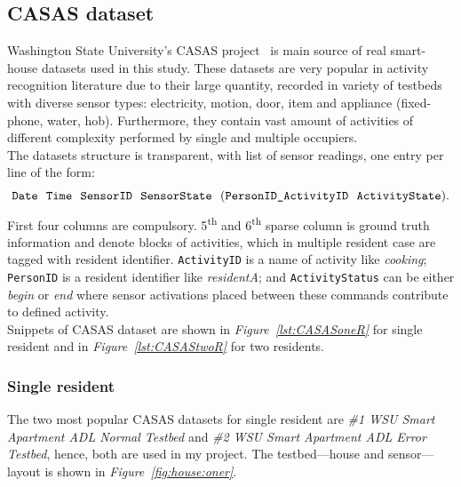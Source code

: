 \documentclass[10pt, a4paper, pdflatex, leqno, twoside, openright]{report}
\newcommand{\ts}{\textsuperscript}
\begin{document}
    \subsection{CASAS dataset\label{sec:csasDataDet}}
Washington State University's CASAS project~\citep{cook2009assessing} is main source of real smart-house datasets used in this study. These datasets are very popular in activity recognition literature due to their large quantity, recorded in variety of testbeds with diverse sensor types: electricity, motion, door, item and appliance (fixed-phone, water, hob). Furthermore, they contain vast amount of activities of different complexity performed by single and multiple occupiers.\\
The datasets structure is transparent, with list of sensor readings, one entry per line of the form:
$$
\text{\texttt{Date}~~\texttt{Time}~~\texttt{SensorID}~~\texttt{SensorState}~~(\texttt{PersonID\_ActivityID}~~\texttt{ActivityState}).}
$$
First four columns are compulsory. 5\ts{th} and 6\ts{th} sparse column is ground truth information and denote blocks of activities, which in multiple resident case are tagged with resident identifier. \texttt{ActivityID} is a name of activity like \emph{cooking}; \texttt{PersonID} is a resident identifier like \emph{residentA}; and \texttt{ActivityStatus} can be either \emph{begin} or \emph{end} where sensor activations placed between these commands contribute to defined activity.\\
Snippets of CASAS dataset are shown in \emph{Figure~\ref{lst:CASASoneR}} for single resident and in \emph{Figure~\ref{lst:CASAStwoR}} for two residents.

      \subsubsection{Single resident}
The two most popular CASAS datasets for single resident are \emph{\#1 WSU Smart Apartment ADL Normal Testbed} and \emph{\#2 WSU Smart Apartment ADL Error Testbed}, hence, both are used in my project. The testbed---house and sensor---layout is shown in \emph{Figure~\ref{fig:house:oner}}.
\end{document}
